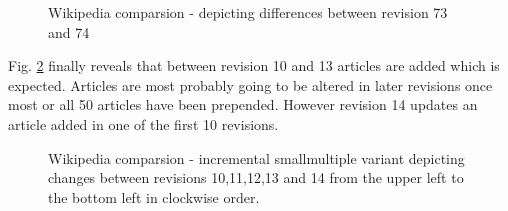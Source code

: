 \begin{figure}[tb]
\caption{\label{fig:wikipedia-rev7374} Wikipedia comparsion - depicting differences between revision 73 and 74}
\end{figure}

Fig. \ref{fig:wikipedia-smallmultiple-incremental} finally reveals that between revision 10 and 13 articles are added which is expected. Articles are most probably going to be altered in later revisions once most or all 50 articles have been pre\-pen\-ded. However revision 14 updates an article added in one of the first 10 revisions.

\begin{figure}[tb]
\caption{\label{fig:wikipedia-smallmultiple-incremental} Wikipedia comparsion - incremental smallmultiple variant depicting changes between revisions 10,11,12,13 and 14 from the upper left to the bottom left in clockwise order.}
\end{figure}

